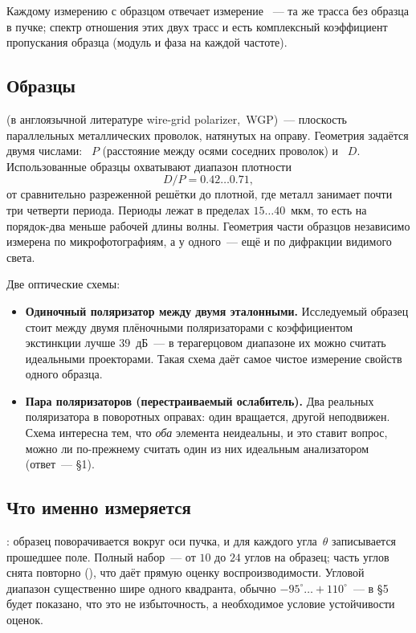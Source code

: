 Каждому измерению с образцом отвечает измерение ~--- та же трасса без образца в
пучке; спектр отношения этих двух трасс и есть комплексный коэффициент пропускания образца
(модуль и фаза на каждой частоте).

\subsection*{Образцы}

 (в англоязычной литературе wire-grid polarizer,~WGP)~---
плоскость параллельных металлических проволок, натянутых на оправу. Геометрия задаётся двумя
числами: ~$P$ (расстояние между осями соседних проволок) и ~$D$. Использованные образцы охватывают диапазон плотности
\[
  D/P = 0.42\ldots0.71,
\]
от сравнительно разреженной решётки до плотной, где металл занимает почти три четверти периода.
Периоды лежат в пределах $15\ldots40$~мкм, то есть на порядок-два меньше рабочей длины волны.
Геометрия части образцов независимо измерена по микрофотографиям, а у одного~--- ещё и по
дифракции видимого света.

Две оптические схемы:

\begin{itemize}[leftmargin=1.4em,itemsep=0.3em]
  \item \textbf{Одиночный поляризатор между двумя эталонными.} Исследуемый образец стоит между
        двумя плёночными поляризаторами с коэффициентом экстинкции лучше $39$~дБ~--- в
        терагерцовом диапазоне их можно считать идеальными проекторами. Такая схема даёт самое
        чистое измерение свойств одного образца.
  \item \textbf{Пара поляризаторов (перестраиваемый ослабитель).} Два реальных поляризатора в
        поворотных оправах: один вращается, другой неподвижен. Схема интересна тем, что
        \emph{оба} элемента неидеальны, и это ставит вопрос, можно ли по-прежнему считать один
        из них идеальным анализатором (ответ~--- §1).
\end{itemize}

\subsection*{Что именно измеряется}

: образец поворачивается вокруг оси пучка, и для каждого угла~$\theta$
записывается прошедшее поле. Полный набор~--- от $10$ до $24$ углов на образец; часть углов
снята повторно (), что даёт прямую оценку воспроизводимости. Угловой диапазон
существенно шире одного квадранта, обычно $-95^\circ\ldots+110^\circ$~--- в §5 будет показано,
что это не избыточность, а необходимое условие устойчивости оценок.

